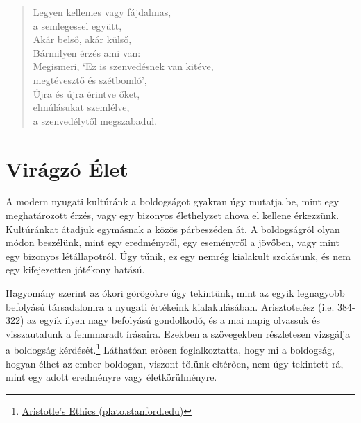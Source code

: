 \begin{quote}
Legyen kellemes vagy fájdalmas,\\
a semlegessel együtt,\\
Akár belső, akár külső,\\
Bármilyen érzés ami van:\\
Megismeri, `Ez is szenvedésnek van kitéve,\\
megtévesztő és szétbomló',\\
Újra és újra érintve őket,\\
elmúlásukat szemlélve,\\
a szenvedélytől megszabadul.

\bigskip

\end{quote}

\clearpage

\section{Virágzó Élet}


\noindent A modern nyugati kultúránk a boldogságot gyakran úgy mutatja
be, mint egy meghatározott érzés, vagy egy bizonyos élethelyzet ahova el
kellene érkezzünk. Kultúránkat átadjuk egymásnak a közös párbeszéden át.
A boldogságról olyan módon beszélünk, mint egy eredményről, egy
eseményről a jövőben, vagy mint egy bizonyos létállapotról. Úgy tűnik,
ez egy nemrég kialakult szokásunk, és nem egy kifejezetten jótékony
hatású.

Hagyomány szerint az ókori görögökre úgy tekintünk, mint az egyik
legnagyobb befolyású társadalomra a nyugati értékeink kialakulásában.
Arisztotelész (i.e. 384-322) az egyik ilyen nagy befolyású gondolkodó,
és a mai napig olvassuk és visszautalunk a fennmaradt írásaira. Ezekben
a szövegekben részletesen vizsgálja a boldogság kérdését.\footnote{\href{https://plato.stanford.edu/entries/aristotle-ethics/}{Aristotle's
  Ethics (plato.stanford.edu)}} Láthatóan erősen foglalkoztatta, hogy mi
a boldogság, hogyan élhet az ember boldogan, viszont tőlünk eltérően,
nem úgy tekintett rá, mint egy adott eredményre vagy életkörülményre.

\enlargethispage*{\baselineskip}

